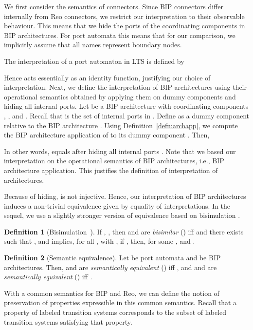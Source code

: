 \documentclass[submission,copyright,creativecommons,hidelinks]{eptcs}
\theoremstyle{plain} \newtheorem{theorem}{Theorem}
\theoremstyle{definition}
\newtheorem{definition}{Definition}
\theoremstyle{remark}
\newcommand{\defn}[1]{Definition~\ref{defn:#1}}
\begin{document}
We first consider the semantics of connectors. Since BIP connectors differ internally from Reo connectors, we restrict our interpretation to their observable behaviour. This means that we hide the ports of the coordinating components in BIP architectures. For port automata this means that for our comparison, we implicitly assume that all names represent boundary nodes.

The interpretation of a port automaton in LTS is defined by

Hence  acts essentially as an identity function, justifying our choice of interpretation. 
Next, we define the interpretation of BIP architectures using their operational semantics obtained by applying them on dummy components and hiding all internal ports. 
Let  be a BIP architecture with coordinating components , , and . 
Recall that  is the set of internal ports in . Define 
 as a dummy component relative to the BIP architecture .
Using \defn{archapp}, we compute the BIP architecture application  of  to its dummy component . 
Then, 

In other words,  equals  after hiding all internal ports .
Note that we based our interpretation  on the operational semantics of BIP architectures, i.e., BIP architecture application. This justifies the definition of interpretation of architectures.

Because of hiding,  is not injective. Hence, our interpretation of BIP architectures induces a non-trivial equivalence given by equality of interpretations. In the sequel, we use a slightly stronger version of equivalence based on bisimulation \cite{Milner89}. 

\begin{definition}[Bisimulation~\cite{Milner89}]
\label{defn:bisim}
If , , then  and  are \emph{bisimilar} () iff  and there exists  such that , and  implies, for all ,  with , if , then, for some ,  and .
\end{definition}

\begin{definition}[Semantic equivalence]
	Let  be port automata and  be BIP architectures. Then,  and  are {\em semantically equivalent} () iff , and  and  are {\em semantically equivalent} () iff .
\end{definition}


With a common semantics for BIP and Reo, we can define the notion of preservation of properties expressible in this common semantics. Recall that a property of labeled transition systems corresponds to the subset of labeled transition systems satisfying that property. 
\end{document}
